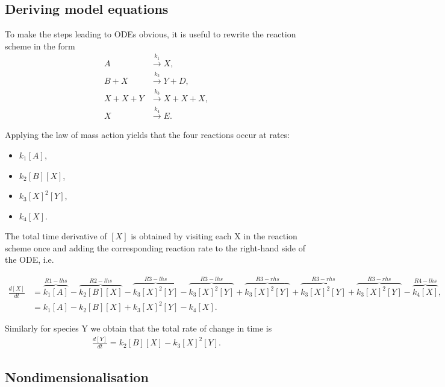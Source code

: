 \documentclass[
  letterpaper,
  DIV=11,
  numbers=noendperiod]{scrreprt}
\providecommand{\tightlist}{%
  \setlength{\itemsep}{0pt}\setlength{\parskip}{0pt}}\usepackage{longtable,booktabs,array}
\begin{document}
\hypertarget{deriving-model-equations}{%
\subsection{Deriving model equations}\label{deriving-model-equations}}

To make the steps leading to ODEs obvious, it is useful to rewrite the
reaction scheme in the form \[
 \begin{aligned}
A&\xrightarrow{k_{1}} X,  \nonumber \\
B+X&\xrightarrow{k_{2}} Y+D, \nonumber\\
X+X+Y&\xrightarrow{k_{3}} X+X+X, \nonumber\\
X&\xrightarrow{k_{4}} E. 
\end{aligned}
\]

Applying the law of mass action yields that the four reactions occur at
rates:

\begin{itemize}
\tightlist
\item
  \(k_1[A]\),
\item
  \(k_2[B][X]\),
\item
  \(k_3[X]^2[Y]\),
\item
  \(k_4[X]\).
\end{itemize}

The total time derivative of \([X]\) is obtained by visiting each X in
the reaction scheme once and adding the corresponding reaction rate to
the right-hand side of the ODE, i.e.

\[  
 \begin{aligned}
 \frac{d[X]}{dt} &= \overbrace{k_1[A]}^{R1-lhs} - \overbrace{k_2[B][X]}^{R2-lhs} -  \overbrace{k_3[X]^2[Y]}^{R3-lhs} - \overbrace{k_3[X]^2[Y]}^{R3-lhs} + \overbrace{k_3[X]^2[Y]}^{R3-rhs}+ \overbrace{k_3[X]^2[Y]}^{R3-rhs}+ \overbrace{k_3[X]^2[Y]}^{R3-rhs} -\overbrace{k_4[X]}^{R4-lhs}, \nonumber \\
        &= k_1[A] - k_2[B][X] + k_3[X]^2[Y]   -k_4[X]. 
 \end{aligned}
 \]

Similarly for species Y we obtain that the total rate of change in time
is \[ 
 \begin{aligned}
  \frac{d[Y]}{dt}=k_2[B][X]-k_3[X]^2[Y].
 \end{aligned}
\]

\hypertarget{nondimensionalisation-6}{%
\subsection{Nondimensionalisation}\label{nondimensionalisation-6}}
\end{document}
